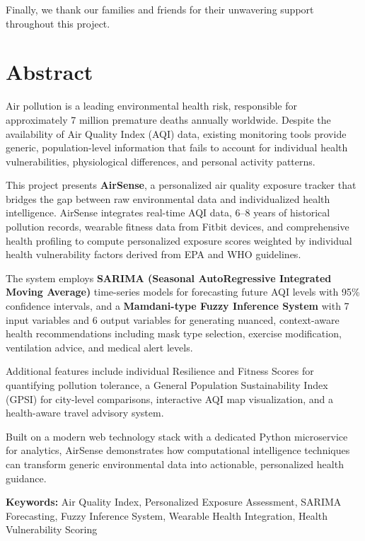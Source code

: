 \documentclass[12pt,a4paper]{report}
\begin{document}
Finally, we thank our families and friends for their unwavering support throughout this project.

\newpage
\chapter*{Abstract}
Air pollution is a leading environmental health risk, responsible for approximately 7 million premature deaths annually worldwide. Despite the availability of Air Quality Index (AQI) data, existing monitoring tools provide generic, population-level information that fails to account for individual health vulnerabilities, physiological differences, and personal activity patterns.

This project presents \textbf{AirSense}, a personalized air quality exposure tracker that bridges the gap between raw environmental data and individualized health intelligence. AirSense integrates real-time AQI data, 6--8 years of historical pollution records, wearable fitness data from Fitbit devices, and comprehensive health profiling to compute personalized exposure scores weighted by individual health vulnerability factors derived from EPA and WHO guidelines.

The system employs \textbf{SARIMA (Seasonal AutoRegressive Integrated Moving Average)} time-series models for forecasting future AQI levels with 95\% confidence intervals, and a \textbf{Mamdani-type Fuzzy Inference System} with 7 input variables and 6 output variables for generating nuanced, context-aware health recommendations including mask type selection, exercise modification, ventilation advice, and medical alert levels.

Additional features include individual Resilience and Fitness Scores for quantifying pollution tolerance, a General Population Sustainability Index (GPSI) for city-level comparisons, interactive AQI map visualization, and a health-aware travel advisory system.

Built on a modern web technology stack with a dedicated Python microservice for analytics, AirSense demonstrates how computational intelligence techniques can transform generic environmental data into actionable, personalized health guidance.

\textbf{Keywords:} Air Quality Index, Personalized Exposure Assessment, SARIMA Forecasting, Fuzzy Inference System, Wearable Health Integration, Health Vulnerability Scoring

\newpage
\tableofcontents
\newpage
\listoffigures
\newpage
\listoftables
\end{document}
